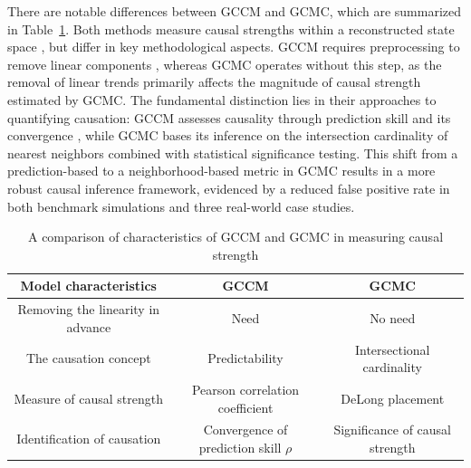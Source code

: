 \documentclass[authoryear,preprint,review,12pt]{elsarticle}
\begin{document}
There are notable differences between GCCM and GCMC, which are summarized in Table~\ref{tbl_diff}. Both methods measure causal strengths within a reconstructed state space \citep{Takens1981embedding,Mane1981embedding,sugihara2012ccm}, but differ in key methodological aspects. GCCM requires preprocessing to remove linear components \citep{gao2023gccm}, whereas GCMC operates without this step, as the removal of linear trends primarily affects the magnitude of causal strength estimated by GCMC. The fundamental distinction lies in their approaches to quantifying causation: GCCM assesses causality through prediction skill and its convergence \citep{sugihara2012ccm,gao2023gccm}, while GCMC bases its inference on the intersection cardinality of nearest neighbors combined with statistical significance testing. This shift from a prediction-based to a neighborhood-based metric in GCMC results in a more robust causal inference framework, evidenced by a reduced false positive rate in both benchmark simulations and three real-world case studies.

\begin{table}[htb]
\centering
\caption{A comparison of characteristics of GCCM and GCMC in measuring causal strength}
\label{tbl_diff}
{\scriptsize
\begin{tabular}{|c|c|c|}
\hline
\textbf{Model characteristics} & \textbf{GCCM} & \textbf{GCMC} \\
\hline
Removing the linearity in advance & Need & No need \\
\hline
The causation concept & Predictability & Intersectional cardinality \\
\hline
Measure of causal strength & Pearson correlation coefficient & DeLong placement \\ 
\hline
Identification of causation & Convergence of prediction skill \(\rho\) & Significance of causal strength \\
\hline
\end{tabular}
}
\end{table}
\end{document}

